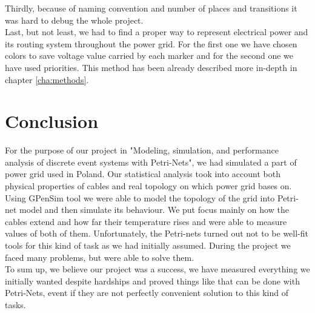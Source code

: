 \documentclass[a4paper]{article}
\begin{document}
Thirdly, because of naming convention and number of places and transitions it was hard to debug the whole project.\\

Last, but not least, we had to find a proper way to represent electrical power and its routing system throughout the power grid. For the first one we have chosen colors to save voltage value carried by each marker and for the second one we have used priorities. This method has been already described more in-depth in chapter \ref{cha:methods}.\\

% 

%
\section{Conclusion}
\label{cha:conclusion}

For the purpose of our project in "Modeling, simulation, and performance analysis of discrete event systems with Petri-Nets", we had simulated a part of power grid used in Poland. Our statistical analysis took into account both physical properties of cables and real topology on which power grid bases on. Using GPenSim tool \cite{Art2} we were able to model the topology of the grid into Petri-net model and then simulate its behaviour. We put focus mainly on how the cables extend and how far their temperature rises and were able to measure values of both of them. Unfortunately, the Petri-nets turned out not to be well-fit tools for this kind of task as we had initially assumed. During the project we faced many problems, but were able to solve them.\\To sum up, we believe our project was a success, we have measured everything we initially wanted despite hardships and proved things like that can be done with Petri-Nets, event if they are not perfectly convenient solution to this kind of tasks.

\end{document}
